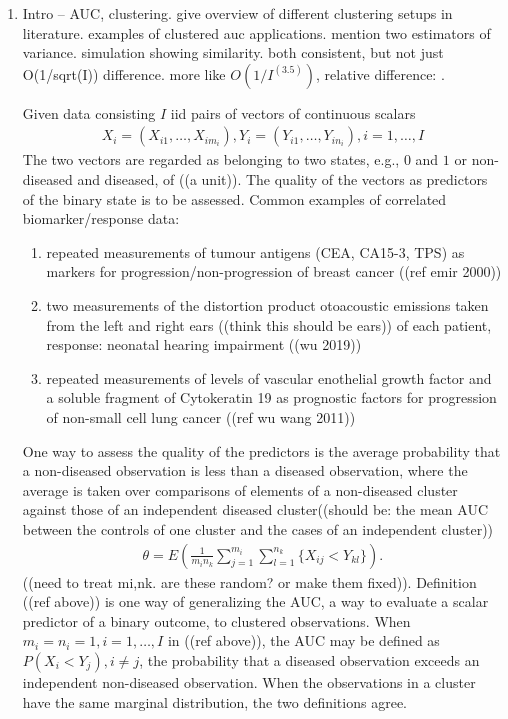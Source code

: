 \documentclass{article}
\newcommand{\E}{E}
\renewcommand{\P}{P}
\newcommand{\I}{I}
\begin{document}
\begin{enumerate}
\item Intro -- AUC, clustering. give overview of different clustering
  setups in literature. examples of clustered auc
  applications. mention two estimators of variance. simulation showing
  similarity. both consistent, but not just O(1/sqrt(I))
  difference. more like $O(1/I^(3.5))$, relative difference: . 

  Given data consisting $\I$ iid pairs of vectors of continuous scalars
  \begin{align}
    X_i=(X_{i1},\ldots,X_{im_i}),Y_i=(Y_{i1},\ldots,Y_{in_i}),i=1,\ldots,\I
  \end{align}
  The two vectors are regarded as belonging to two states, e.g., $0$
  and $1$ or non-diseased and diseased, of ((a unit)). The quality of
  the vectors as predictors of the binary state is to be assessed. Common examples of correlated biomarker/response data:
  \begin{enumerate}
  \item  repeated measurements of tumour antigens (CEA, CA15-3, TPS) as markers for progression/non-progression of breast cancer ((ref emir 2000))

  \item two measurements of the distortion product otoacoustic
    emissions taken from the left and right ears ((think this should
    be ears)) of each patient, response: neonatal hearing impairment
    ((wu 2019))

   \item repeated measurements of levels of vascular enothelial growth
     factor and a soluble fragment of Cytokeratin 19 as prognostic
     factors for progression of non-small cell lung cancer ((ref wu
     wang 2011))
   \end{enumerate}
   
   One way to assess the quality of the predictors is the average
   probability that a non-diseased observation is less than a diseased
   observation, where the average is taken over comparisons of
   elements of a non-diseased cluster against those of an independent
   diseased cluster((should be: the mean AUC between the controls of
   one cluster and the cases of an independent cluster))
  \begin{align}
    \theta=\E\left(\frac{1}{m_in_k}\sum_{j=1}^{m_i}\sum_{l=1}^{n_k}\{X_{ij}<Y_{kl}\}\right).
  \end{align}
  ((need to treat mi,nk. are these random? or make them fixed)).
  Definition ((ref above)) is one way of generalizing the AUC, a way
  to evaluate a scalar predictor of a binary outcome, to clustered
  observations. When $m_i=n_i=1,i=1,\ldots,\I$ in ((ref above)), the
  AUC may be defined as $\P(X_i<Y_j), i\neq j$, the probability that a
  diseased observation exceeds an independent non-diseased
  observation.  When the observations in a cluster have the same
  marginal distribution, the two definitions agree.
  

\end{enumerate}
\end{document}
